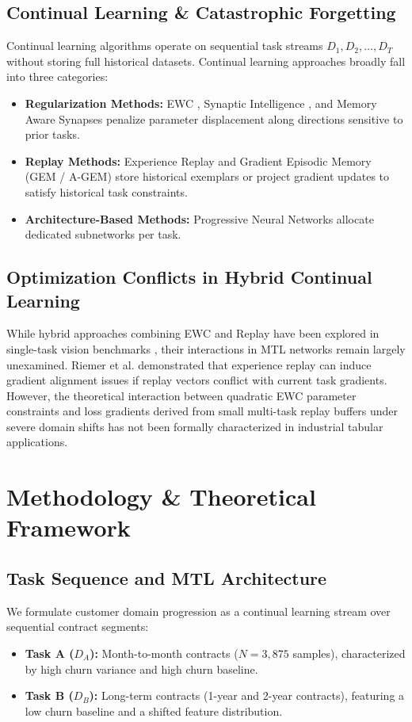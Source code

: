 \documentclass{article}
\begin{document}
\subsection{Continual Learning \& Catastrophic Forgetting}
Continual learning algorithms operate on sequential task streams $D_1, D_2, \dots, D_T$ without storing full historical datasets. Continual learning approaches broadly fall into three categories:
\begin{itemize}
    \item \textbf{Regularization Methods:} EWC \cite{kirkpatrick2017overcoming}, Synaptic Intelligence \cite{zenke2017continual}, and Memory Aware Synapses \cite{aljundi2018memory} penalize parameter displacement along directions sensitive to prior tasks.
    \item \textbf{Replay Methods:} Experience Replay \cite{chaudhry2019efficient} and Gradient Episodic Memory (GEM / A-GEM) \cite{lopez2017gradient, chaudhry2018efficient} store historical exemplars or project gradient updates to satisfy historical task constraints.
    \item \textbf{Architecture-Based Methods:} Progressive Neural Networks \cite{rusu2016progressive} allocate dedicated subnetworks per task.
\end{itemize}

\subsection{Optimization Conflicts in Hybrid Continual Learning}
While hybrid approaches combining EWC and Replay have been explored in single-task vision benchmarks \cite{nguyen2018variational, riemer2019learning}, their interactions in MTL networks remain largely unexamined. Riemer et al. \cite{riemer2019learning} demonstrated that experience replay can induce gradient alignment issues if replay vectors conflict with current task gradients. However, the theoretical interaction between quadratic EWC parameter constraints and loss gradients derived from small multi-task replay buffers under severe domain shifts has not been formally characterized in industrial tabular applications.

\section{Methodology \& Theoretical Framework}

\subsection{Task Sequence and MTL Architecture}
We formulate customer domain progression as a continual learning stream over sequential contract segments:
\begin{itemize}
    \item \textbf{Task A ($D_A$):} Month-to-month contracts ($N = 3,875$ samples), characterized by high churn variance and high churn baseline.
    \item \textbf{Task B ($D_B$):} Long-term contracts (1-year and 2-year contracts), featuring a low churn baseline and a shifted feature distribution.
\end{itemize}
\end{document}
